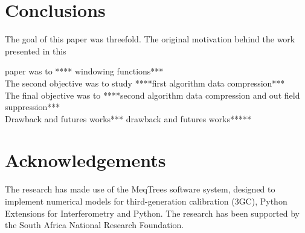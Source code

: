 \documentclass[useAMS,usenatbib]{mn2e}
\begin{document}
\section{Conclusions}
The goal of this paper was threefold. The original motivation behind the work presented in this

paper was to **** windowing functions***\\
The second objective  was to study ****first algorithm data compression***\\
The final objective was to ****second algorithm data compression and out field suppression*** \\
Drawback and futures works*** drawback and futures works*****
\section*{Acknowledgements}
The research has made use of the MeqTrees software system, designed to implement numerical models for third-generation calibration (3GC), 
 Python Extensions for Interferometry and Python. The research has been supported by the South Africa National Research Foundation.


\appendix
\end{document}
